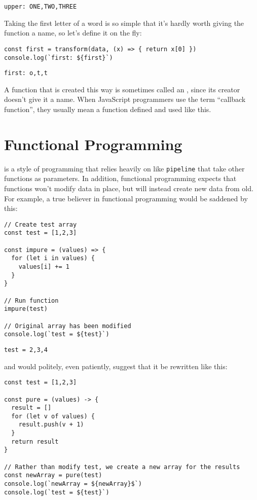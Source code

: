 \begin{verbatim}
upper: ONE,TWO,THREE
\end{verbatim}

Taking the first letter of a word is so simple that it's hardly worth giving the function a name,
so let's define it on the fly:

\begin{verbatim}
const first = transform(data, (x) => { return x[0] })
console.log(`first: ${first}`)
\end{verbatim}

\begin{verbatim}
first: o,t,t
\end{verbatim}

A function that is created this way is sometimes called an ,
since its creator doesn't give it a name.
When JavaScript programmers use the term ``callback function'',
they usually mean a function defined and used like this.

\section{Functional Programming}\label{s:callbacks-functional}

 is a style of programming
that relies heavily on  like \texttt{pipeline}
that take other functions as parameters.
In addition,
functional programming expects that functions won't modify data in place,
but will instead create new data from old.
For example,
a true believer in functional programming would be saddened by this:

\begin{verbatim}
// Create test array
const test = [1,2,3]

const impure = (values) => {
  for (let i in values) {
    values[i] += 1
  }
}

// Run function
impure(test)

// Original array has been modified
console.log(`test = ${test}`)
\end{verbatim}

\begin{verbatim}
test = 2,3,4
\end{verbatim}

\noindent
and would politely, even patiently, suggest that it be rewritten like this:

\begin{verbatim}
const test = [1,2,3]

const pure = (values) -> {
  result = []
  for (let v of values) {
    result.push(v + 1)
  }
  return result
}

// Rather than modify test, we create a new array for the results
const newArray = pure(test)
console.log(`newArray = ${newArray}$`)
console.log(`test = ${test}`)
\end{verbatim}

